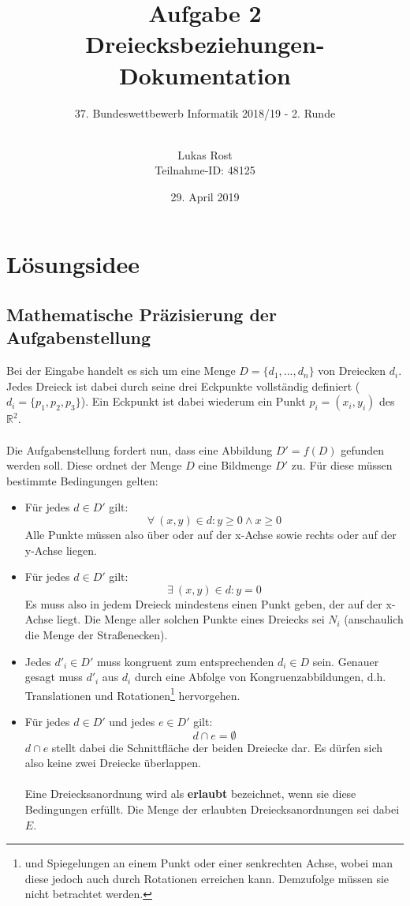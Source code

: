 \documentclass[a4paper, notitlepage, 12pt]{scrartcl}
\author{Lukas Rost \\ \small{Teilnahme-ID: 48125}}
\title{Aufgabe 2 \\ \glqq Dreiecksbeziehungen\grqq  - Dokumentation}
\subtitle{37. Bundeswettbewerb Informatik 2018/19 - 2. Runde \\~\\}
\date{29. April 2019}
\begin{document}
\renewcommand{\contentsname}{\centerline{Inhaltsverzeichnis}}
 \maketitle
 \tableofcontents
 \thispagestyle{empty}
 \newpage
 \setcounter{page}{1}
 
 \section{Lösungsidee}
 \subsection{Mathematische Präzisierung der Aufgabenstellung}
 Bei der Eingabe handelt es sich um eine Menge $D = \{d_1,...,d_n\}$ von Dreiecken $d_i$. Jedes Dreieck ist dabei durch seine drei Eckpunkte vollständig definiert ($d_i = \{p_1,p_2,p_3\}$). Ein Eckpunkt ist dabei wiederum ein Punkt $p_i = (x_i,y_i)$ des $\mathbb{R}^2$. \\ \\
 Die Aufgabenstellung fordert nun, dass eine Abbildung $D' = f(D)$ gefunden werden soll. Diese ordnet der Menge $D$ eine Bildmenge $D'$ zu. Für diese müssen bestimmte Bedingungen gelten:
 \begin{itemize}
 	\item Für jedes $d \in D'$ gilt:
 	\begin{equation}
 	\forall ~(x,y) \in d: y \geq 0 \wedge x \geq 0
 	\end{equation}
 	Alle Punkte müssen also über oder auf der x-Achse sowie rechts oder auf der y-Achse liegen.
 	\item Für jedes $d \in D'$ gilt:
 	\begin{equation}
 	\exists ~(x,y) \in d: y = 0
 	\end{equation}
 	Es muss also in jedem Dreieck mindestens einen Punkt geben, der auf der x-Achse liegt. Die Menge aller solchen Punkte eines Dreiecks sei $N_i$ (anschaulich die Menge der Straßenecken). 	
 	\item Jedes $d'_i \in D'$ muss kongruent zum entsprechenden $d_i \in D$ sein. Genauer gesagt muss $d'_i$ aus $d_i$ durch eine Abfolge von Kongruenzabbildungen, d.h. Translationen und Rotationen\footnote{ und Spiegelungen an einem Punkt oder einer senkrechten Achse, wobei man diese jedoch auch durch Rotationen erreichen kann. Demzufolge müssen sie nicht betrachtet werden.} hervorgehen.
 	\item Für jedes $d \in D'$ und jedes $e \in D'$ gilt:
 	\begin{equation}
 	d \cap e = \emptyset
 	\end{equation}
 	$d \cap e$ stellt dabei die Schnittfläche der beiden Dreiecke dar. Es dürfen sich also keine zwei Dreiecke überlappen.\\ \\
 	Eine Dreiecksanordnung wird als \textbf{erlaubt} bezeichnet, wenn sie diese Bedingungen erfüllt. Die Menge der erlaubten Dreiecksanordnungen sei dabei $E$.
  \end{itemize}
\end{document}
